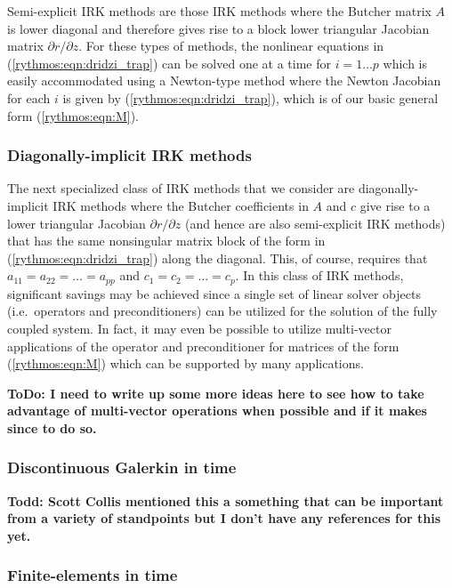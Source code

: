 \documentclass[pdf,ps2pdf,11pt]{SANDreport}
\begin{document}
Semi-explicit IRK methods are those IRK methods where the Butcher matrix $A$
is lower diagonal and therefore gives rise to a block lower triangular
Jacobian matrix ${}\partial r / {}\partial z$.  For these types of methods,
the nonlinear equations in (\ref{rythmos:eqn:dridzi_trap}) can be solved one
at a time for $i = 1 {}\ldots p$ which is easily accommodated using a
Newton-type method where the Newton Jacobian for each $i$ is given by
(\ref{rythmos:eqn:dridzi_trap}), which is of our basic general form
(\ref{rythmos:eqn:M}).

\subsubsection*{Diagonally-implicit IRK methods}

The next specialized class of IRK methods that we consider are
diagonally-implicit IRK methods where the Butcher coefficients in $A$ and $c$
give rise to a lower triangular Jacobian ${}\partial r / {}\partial z$ (and
hence are also semi-explicit IRK methods) that has the same nonsingular matrix
block of the form in (\ref{rythmos:eqn:dridzi_trap}) along the diagonal.
This, of course, requires that $a_{11} = a_{22} = {}\ldots = a_{pp}$ and
$c_{1} = c_{2} = {}\ldots = c_{p}$.  In this class of IRK methods, significant
savings may be achieved since a single set of linear solver objects (i.e.\
operators and preconditioners) can be utilized for the solution of the fully
coupled system.  In fact, it may even be possible to utilize multi-vector
applications of the operator and preconditioner for matrices of the form
(\ref{rythmos:eqn:M}) which can be supported by many applications.

{}\textbf{ToDo: I need to write up some more ideas here to see how to take
advantage of multi-vector operations when possible and if it makes since to do
so.}

\subsubsection{Discontinuous Galerkin in time}

\cite{DGTime}
{}\textbf{Todd: Scott Collis mentioned this a something that can be important
from a variety of standpoints but I don't have any references for this yet.}

\subsubsection{Finite-elements in time }
\end{document}

